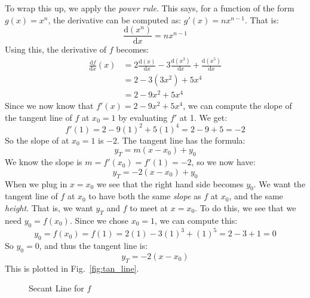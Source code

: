 \documentclass{article}
\begin{document}
    To wrap this up, we apply the \textit{power rule}. This says, for a
    function of the form $g(x)=x^{n}$, the derivative can be computed as:
    $g'(x)=nx^{n-1}$. That is:
    \begin{equation}
        \frac{\textrm{d}(x^{n})}{\textrm{d}x}
        =nx^{n-1}
    \end{equation}
    Using this, the derivative of $f$ becomes:
    \begin{align}
        \frac{\textrm{d}f}{\textrm{d}x}(x)
        &=2\frac{\textrm{d}(x)}{\textrm{d}x}-
            3\frac{\textrm{d}(x^{3})}{\textrm{d}x}+
            \frac{\textrm{d}(x^{5})}{\textrm{d}x}\\
        &=2-3(3x^{2})+5x^{4}\\
        &=2-9x^{2}+5x^{4}
    \end{align}
    Since we now know that $f'(x)=2-9x^{2}+5x^{4}$, we can compute the slope of
    the tangent line of $f$ at $x_{0}=1$ by evaluating $f'$ at 1. We get:
    \begin{equation}
        f'(1)=2-9(1)^{2}+5(1)^{4}=2-9+5=-2
    \end{equation}
    So the slope of at $x_{0}=1$ is $-2$. The tangent line has the formula:
    \begin{equation}
        y_{T}=m(x-x_{0})+y_{0}
    \end{equation}
    We know the slope is $m=f'(x_{0})=f'(1)=-2$, so we now have:
    \begin{equation}
        y_{T}=-2(x-x_{0})+y_{0}
    \end{equation}
    When we plug in $x=x_{0}$ we see that the right hand side becomes $y_{0}$.
    We want the tangent line of $f$ at $x_{0}$ to have both the same
    \textit{slope} as $f$ at $x_{0}$, and the same \textit{height}. That is,
    we want $y_{T}$ and $f$ to meet at $x=x_{0}$. To do this, we see that we
    need $y_{0}=f(x_{0})$. Since we chose $x_{0}=1$, we can compute this:
    \begin{equation}
        y_{0}=f(x_{0})=f(1)=2(1)-3(1)^{3}+(1)^{5}=2-3+1=0
    \end{equation}
    So $y_{0}=0$, and thus the tangent line is:
    \begin{equation}
        y_{T}=-2(x-x_{0})
    \end{equation}
    This is plotted in Fig.~\ref{fig:tan_line}.
    \begin{figure}
        \centering
        \caption{Secant Line for $f$}
        \label{fig:sec_line}
    \end{figure}
\end{document}
